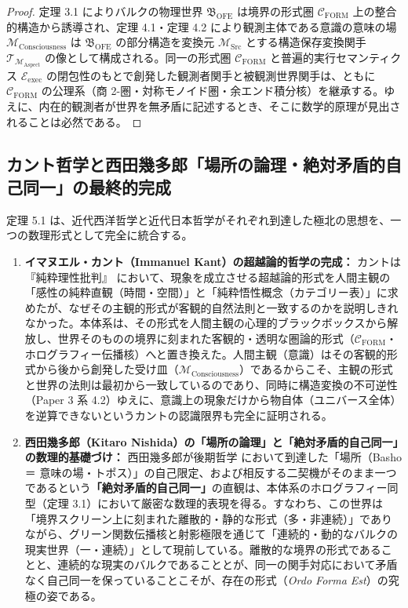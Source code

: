 \documentclass[11pt,a4paper]{ltjsarticle}
\theoremstyle{definition}
\theoremstyle{plain}
\begin{document}
\begin{proof}
定理 3.1 によりバルクの物理世界 $\mathfrak{B}_{\mathrm{OFE}}$ は境界の形式圏 $\mathcal{C}_{\mathrm{FORM}}$ 上の整合的構造から誘導され、定理 4.1・定理 4.2 により観測主体である意識の意味の場 $\mathcal{M}_{\mathrm{Consciousness}}$ は $\mathfrak{B}_{\mathrm{OFE}}$ の部分構造を変換元 $\mathcal{M}_{\mathrm{Src}}$ とする構造保存変換関手 $\mathcal{T}_{\mathcal{M}_{\mathrm{Aspect}}}$ の像として構成される。同一の形式圏 $\mathcal{C}_{\mathrm{FORM}}$ と普遍的実行セマンティクス $\mathcal{E}_{\mathrm{exec}}$ の閉包性のもとで創発した観測者関手と被観測世界関手は、ともに $\mathcal{C}_{\mathrm{FORM}}$ の公理系（商 2-圏・対称モノイド圏・余エンド積分核）を継承する。ゆえに、内在的観測者が世界を無矛盾に記述するとき、そこに数学的原理が見出されることは必然である。
\end{proof}

\subsection{カント哲学と西田幾多郎「場所の論理・絶対矛盾的自己同一」の最終的完成}
定理 5.1 は、近代西洋哲学と近代日本哲学がそれぞれ到達した極北の思想を、一つの数理形式として完全に統合する。

\begin{enumerate}
    \item \textbf{イマヌエル・カント（Immanuel Kant）の超越論的哲学の完成：}
    カントは『純粋理性批判』\cite{Kant1781} において、現象を成立させる超越論的形式を人間主観の「感性の純粋直観（時間・空間）」と「純粋悟性概念（カテゴリー表）」に求めたが、なぜその主観的形式が客観的自然法則と一致するのかを説明しきれなかった。本体系は、その形式を人間主観の心理的ブラックボックスから解放し、世界そのものの境界に刻まれた客観的・透明な圏論的形式（$\mathcal{C}_{\mathrm{FORM}}$・ホログラフィー伝播核）へと置き換えた。人間主観（意識）はその客観的形式から後から創発した受け皿（$\mathcal{M}_{\mathrm{Consciousness}}$）であるからこそ、主観の形式と世界の法則は最初から一致しているのであり、同時に構造変換の不可逆性（Paper 3 \cite{Ota2026_3} 系 4.2）ゆえに、意識上の現象だけから物自体（ユニバース全体）を逆算できないというカントの認識限界も完全に証明される。
    \item \textbf{西田幾多郎（Kitaro Nishida）の「場所の論理」と「絶対矛盾的自己同一」の数理的基礎づけ：}
    西田幾多郎が後期哲学 \cite{Nishida1911,Nishida1927,Nishida1945} において到達した「場所（Basho ＝ 意味の場・トポス）」の自己限定、および相反する二契機がそのまま一つであるという\textbf{「絶対矛盾的自己同一」}の直観は、本体系のホログラフィー同型（定理 3.1）において厳密な数理的表現を得る。すなわち、この世界は「境界スクリーン上に刻まれた離散的・静的な形式（多・非連続）」でありながら、グリーン関数伝播核と射影極限を通じて「連続的・動的なバルクの現実世界（一・連続）」として現前している。離散的な境界の形式であることと、連続的な現実のバルクであることとが、同一の関手対応において矛盾なく自己同一を保っていることこそが、存在の形式（\textit{Ordo Forma Est}）の究極の姿である。
\end{enumerate}
\end{document}
